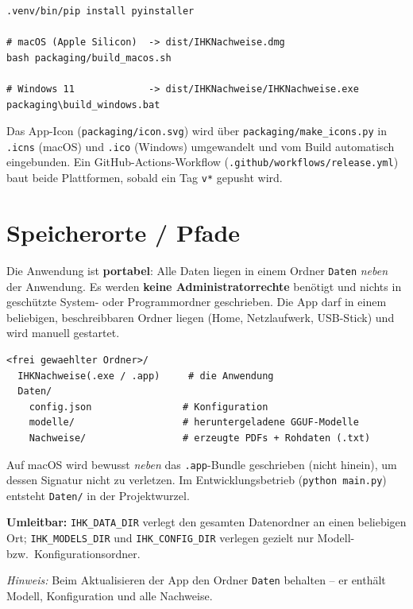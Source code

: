 \documentclass[11pt,a4paper]{article}
\begin{document}
\begin{verbatim}
.venv/bin/pip install pyinstaller

# macOS (Apple Silicon)  -> dist/IHKNachweise.dmg
bash packaging/build_macos.sh

# Windows 11             -> dist/IHKNachweise/IHKNachweise.exe
packaging\build_windows.bat
\end{verbatim}

\noindent
Das App-Icon (\texttt{packaging/icon.svg}) wird \"uber
\texttt{packaging/make\_icons.py} in \texttt{.icns} (macOS) und \texttt{.ico}
(Windows) umgewandelt und vom Build automatisch eingebunden. Ein
GitHub-Actions-Workflow (\texttt{.github/workflows/release.yml}) baut beide
Plattformen, sobald ein Tag \texttt{v*} gepusht wird.

\section{Speicherorte / Pfade}

Die Anwendung ist \textbf{portabel}: Alle Daten liegen in einem Ordner
\texttt{Daten} \emph{neben} der Anwendung. Es werden \textbf{keine
Administratorrechte} ben\"otigt und nichts in gesch\"utzte System- oder
Programmordner geschrieben. Die App darf in einem beliebigen, beschreibbaren
Ordner liegen (Home, Netzlaufwerk, USB-Stick) und wird manuell gestartet.

\begin{verbatim}
<frei gewaehlter Ordner>/
  IHKNachweise(.exe / .app)     # die Anwendung
  Daten/
    config.json                # Konfiguration
    modelle/                   # heruntergeladene GGUF-Modelle
    Nachweise/                 # erzeugte PDFs + Rohdaten (.txt)
\end{verbatim}

\noindent
Auf macOS wird bewusst \emph{neben} das \texttt{.app}-Bundle geschrieben (nicht
hinein), um dessen Signatur nicht zu verletzen. Im Entwicklungsbetrieb
(\texttt{python main.py}) entsteht \texttt{Daten/} in der Projektwurzel.

\medskip
\noindent
\textbf{Umleitbar:} \texttt{IHK\_DATA\_DIR} verlegt den gesamten Datenordner an
einen beliebigen Ort; \texttt{IHK\_MODELS\_DIR} und \texttt{IHK\_CONFIG\_DIR}
verlegen gezielt nur Modell- bzw.\ Konfigurationsordner.

\medskip
\noindent
\emph{Hinweis:} Beim Aktualisieren der App den Ordner \texttt{Daten} behalten --
er enth\"alt Modell, Konfiguration und alle Nachweise.
\end{document}

